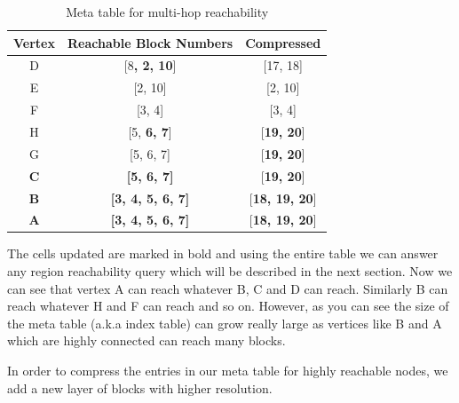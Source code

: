 \begin{table}[h]
	\caption{Meta table for multi-hop reachability}
	\label{tab:multi-hop-meta}
	\begin{center}
		\renewcommand{\arraystretch}{1.25}
		\begin{tabular}{ c | c | c }
			\hline
			Vertex & Reachable Block Numbers & Compressed\\ \hline
			\hline
			D & [8\textbf{, 2, 10}] & [17, 18] \\
			E & [2, 10] & [2, 10] \\
			F & [3, 4] & [3, 4] \\
			H & [5, \textbf{6, 7}] & [\textbf{19, 20}] \\
			G & [5, 6, 7] & [\textbf{19, 20}] \\
			\textbf{C} & \textbf{[5, 6, 7]} & [\textbf{19, 20}] \\
			\textbf{B} & \textbf{[3, 4, 5, 6, 7]} & [\textbf{18, 19, 20}] \\
			\textbf{A} & \textbf{[3, 4, 5, 6, 7]} & [\textbf{18, 19, 20}] \\
			\hline
		\end{tabular}
	\end{center}
\end{table}

{The cells updated are marked in bold and using the entire table we can answer any region reachability query which will be described in the next section. Now we can see that vertex A can reach whatever B, C and D can reach. Similarly B can reach whatever H and F can reach and so on. However, as you can see the size of the meta table (a.k.a index table) can grow really large as vertices like B and A which are highly connected can reach many blocks. }

{In order to compress the entries in our meta table for highly reachable nodes, we add a new layer of blocks with higher resolution.}



